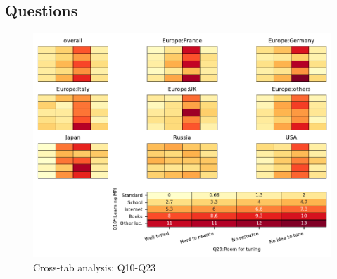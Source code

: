 
\subsection{Questions}


\begin{figure}
\begin{center}
\includegraphics[width=12cm]{../pdfs/Q10-Q23.pdf}
\caption{Cross-tab analysis: Q10-Q23}
\label{fig:Q10-Q23}
\end{center}
\end{figure}
